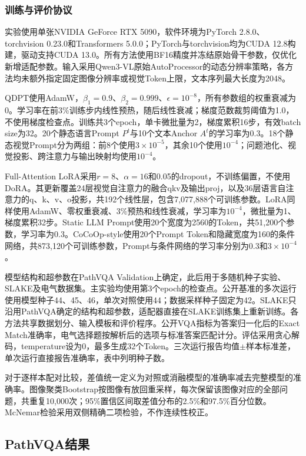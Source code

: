 \subsubsection{训练与评价协议}

实验使用单张NVIDIA GeForce RTX 5090，软件环境为PyTorch 2.8.0、torchvision 0.23.0和Transformers 5.0.0；PyTorch与torchvision均为CUDA 12.8构建，驱动支持CUDA 13.0。所有方法使用BF16精度并冻结原始骨干参数，仅优化新增适配参数。输入采用Qwen3-VL原始AutoProcessor的动态分辨率策略，各方法均未额外指定固定图像分辨率或视觉Token上限，文本序列最大长度为2048。

QDPT使用AdamW，$\beta_1=0.9$、$\beta_2=0.999$、$\epsilon=10^{-8}$，所有参数组的权重衰减为0。学习率在前3\%训练步内线性预热，随后线性衰减；梯度范数裁剪阈值为1.0，不使用梯度检查点。训练共3个epoch，单卡微批量为2，梯度累积16步，有效batch size为32。20个静态语言Prompt $P^t$与10个文本Anchor $A^t$的学习率为0.3。18个静态视觉Prompt分为两组：前8个使用$3\times10^{-5}$，其余10个使用$10^{-4}$；问题池化、视觉投影、跨注意力与输出映射均使用$10^{-4}$。

Full-Attention LoRA采用$r=8$、$\alpha=16$和0.05的dropout，不训练偏置，不使用DoRA。其更新覆盖24层视觉自注意力的融合qkv及输出proj，以及36层语言自注意力的q、k、v、o投影，共192个线性层，包含7,077,888个可训练参数。LoRA同样使用AdamW、零权重衰减、3\%预热和线性衰减，学习率为$10^{-4}$，微批量为1、梯度累积32步。Static LLM Prompt使用20个宽度为2560的Token，共51,200个参数，学习率为0.3。CoCoOp-style使用20个Prompt Token和隐藏宽度为160的条件网络，共873,120个可训练参数，Prompt与条件网络的学习率分别为0.3和$3\times10^{-4}$。

模型结构和超参数在PathVQA Validation上确定，此后用于多随机种子实验、SLAKE及电气数据集。主实验均使用第3个epoch的检查点。公开基准的多次运行使用模型种子44、45、46，单次对照使用44；数据采样种子固定为42。SLAKE只沿用PathVQA确定的结构和超参数，适配器直接在SLAKE训练集上重新训练。各方法共享数据划分、输入模板和评价程序。公开VQA指标为答案归一化后的Exact Match准确率，电气选择题按解析后的选项与标准答案匹配计分。评估采用贪心解码，temperature设为0，最多生成32个Token。三次运行报告均值$\pm$样本标准差，单次运行直接报告准确率，表中列明种子数。

对于逐样本配对比较，差值统一定义为对照或消融模型的准确率减去完整模型的准确率。图像聚类Bootstrap按图像有放回重采样，每次保留该图像对应的全部问题，共重复10,000次；95\%置信区间取差值分布的2.5\%和97.5\%百分位数。McNemar检验采用双侧精确二项检验，不作连续性校正。

\subsection{PathVQA结果}

